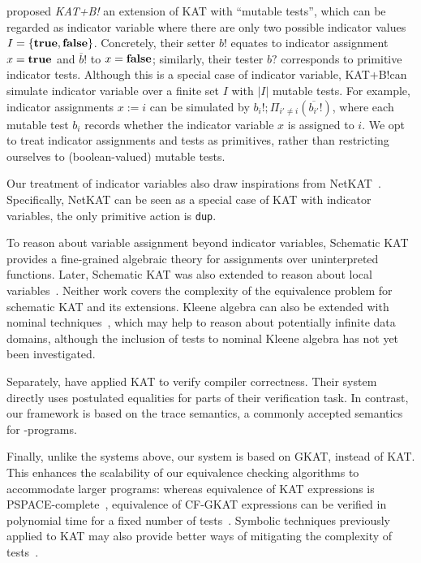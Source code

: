 \citet{grathwohl_KAT_2014} proposed \emph{KAT+B!} an extension of KAT with ``mutable tests'', which can be regarded as indicator variable where there are only two possible indicator values \(I = \{\mathbf{true}, \mathbf{false}\}\).
Concretely, their setter \(b!\) equates to indicator assignment \(x = \mathbf{true}\) and \(\overline{b}!\) to \(x = \mathbf{false}\); similarly, their tester \(b?\) corresponds to primitive indicator tests. %
Although this is a special case of indicator variable, KAT+B!\@ can simulate indicator variable over a finite set \(I\) with \(|I|\) mutable tests.
For example, indicator assignments $x := i$ can be simulated by ${b_i!} ; Π_{i' ≠ i}(\overline{b_{i'}}!)$, where each mutable test \(b_i\) records whether the indicator variable \(x\) is assigned to \(i\). 
We opt to treat indicator assignments and tests as primitives, rather than restricting ourselves to (boolean-valued) mutable tests.

Our treatment of indicator variables also draw inspirations from NetKAT~\cite{Anderson_Foster_Guha_Jeannin_Kozen_Schlesinger_Walker_2014}. 
Specifically, NetKAT can be seen as a special case of KAT with indicator variables, the only primitive action is \texttt{dup}.

To reason about variable assignment beyond indicator variables, Schematic KAT~\cite{angus_KleeneAlgebraTests_2001} provides a fine-grained algebraic theory for assignments over uninterpreted functions.
Later, Schematic KAT was also extended to reason about local variables~\cite{aboul-hosn_LocalVariableScoping_2008a}.
Neither work covers the complexity of the equivalence problem for schematic KAT and its extensions.
Kleene algebra can also be extended with nominal techniques~\cite{kozen_CompletenessIncompletenessNominal_2015,kozen_NominalKleeneCoalgebra_2015,gabbay_FreshnessNameRestrictionSets_2011a}, which may help to reason about potentially infinite data domains, although the inclusion of tests to nominal Kleene algebra has not yet been investigated.

Separately, \citet{kozen_CertificationCompilerOptimizations_2000c} have applied KAT to verify compiler correctness. 
Their system directly uses postulated equalities for parts of their verification task. 
In contrast, our framework is based on the trace semantics, a commonly accepted semantics for -programs.

Finally, unlike the systems above, our system is based on GKAT, instead of KAT\@. 
This enhances the scalability of our equivalence checking algorithms to accommodate larger programs: whereas equivalence of KAT expressions is PSPACE-complete~\cite{Cohen_Kozen_Smith_1999}, equivalence of CF-GKAT expressions can be verified in polynomial time for a fixed number of tests~\cite{Smolka_Foster_Hsu_Kappé_Kozen_Silva_2020}.
Symbolic techniques previously applied to KAT may also provide better ways of mitigating the complexity of tests~\cite{pous_SymbolicAlgorithmsLanguage_2015}.


